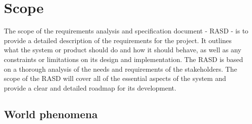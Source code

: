 

\section{Scope}
\label{sec:scope}%
The scope of the requirements analysis and specification document - RASD - is to provide a detailed description of the requirements for the project.
It outlines what the system or product should do and how it should behave, as well as any constraints or limitations on its design and implementation.
The RASD is based on a thorough analysis of the needs and requirements of the stakeholders.
The scope of the RASD will cover all of the essential aspects of the system and provide a clear and detailed roadmap for its development.

\subsection{World phenomena}
\label{subsec:world_phenomena}%
\setcounter{wp}{1}
\newcommand{\cwp}{\thewp\stepcounter{wp}}

